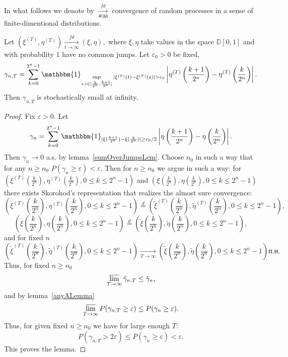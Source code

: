 \documentclass[12pt, a4paper, titlepage]{article}
\begin{document}
 In what follows we denote by $\xrightarrow[агдд]{fd}$ 
 convergence of random processes in a sense of finite-dimentional distributions. 
 \begin{lem}\label{sumOverJumpsStochasticLem}
  Let $(\xi^{(T)}, \eta^{(T)})\xrightarrow[t\to\infty]{fd} (\xi, \eta),$
  where $\xi, \eta$ take values in the space $\mathbb{D}[0,1]$
  and with probability $1$ have no common jumps.  
  Let $\varepsilon_0>0$ be fixed,
  $$\gamma_{n,T}=\sum\limits_{k=0}^{2^n-1}
  \mathbbm{1}_{\sup\limits_{s, t \in [\frac{k}{2^n}, \frac{k+1}{2^n}]}
  |\xi^{(T)}(t)-\xi^{(T)}(s)|>\varepsilon_0}
  \left|\eta^{(T)}\left(\frac{k+1}{2^n}\right)-\eta^{(T)}\left(\frac{k}{2^n}\right)\right|.$$
  Then $\gamma_{n,T}$ is stochastically small at infinity. 
 \end{lem}
 \begin{proof}
  Fix $\varepsilon>0.$
  Let 
  $$\gamma_n=\sum\limits_{k=0}^{2^n-1}
  \mathbbm{1}_{|\xi(\frac{k+1}{2^n})-\xi(\frac{k}{2^n})| \ge \varepsilon_0/2}
  \left|\eta\left(\frac{k+1}{2^n}\right)-\eta\left(\frac{k}{2^n}\right)\right|.$$
  Then $\gamma_n\to 0$ a.s. by lemma~\ref{sumOverJumpsLem}.
  Choose $n_0$ in such a way that for any $n \ge n_0$ $P(\gamma_n \ge \varepsilon)<\varepsilon.$
  Then for $n \ge n_0$ we argue in such a way:
  for $(\xi^{(T)}(\frac{k}{2^n}), \eta^{(T)}(\frac{k}{2^n}), 0 \le k \le 2^n-1)$
  and $(\xi(\frac{k}{2^n}), \eta(\frac{k}{2^n}), 0 \le k \le 2^n-1)$
  there exists Skorohod's representation that realizes the almost sure convergence:
  $$\left(\xi^{(T)}\left(\frac{k}{2^n}\right), \eta^{(T)}\left(\frac{k}{2^n}\right), 
  0 \le k \le 2^n-1\right) \stackrel{d}{=}
  \left(\tilde{\xi}^{(T)}\left(\frac{k}{2^n}\right), \tilde{\eta}^{(T)}\left(\frac{k}{2^n}\right), 
  0 \le k \le 2^n-1\right),$$
  $$\left(\xi\left(\frac{k}{2^n}\right), \eta\left(\frac{k}{2^n}\right), 
  0 \le k \le 2^n-1\right) \stackrel{d}{=}
  \left(\tilde{\xi}\left(\frac{k}{2^n}\right), \tilde{\eta}\left(\frac{k}{2^n}\right), 
  0 \le k \le 2^n-1\right),$$
  and for fixed $n$
  $$\left(\tilde{\xi}^{(T)}\left(\frac{k}{2^n}\right), \tilde{\eta}^{(T)}\left(\frac{k}{2^n}\right), 
  0 \le k \le 2^n-1\right) 
  \xrightarrow[T\to\infty]{}
  \left(\tilde{\xi}\left(\frac{k}{2^n}\right), \tilde{\eta}\left(\frac{k}{2^n}\right), 
  0 \le k \le 2^n-1\right) \mbox{п.н.}$$
  Thus, for fixed $n \ge n_0$
  $$\varlimsup\limits_{T \to \infty}\tilde{\gamma}_{n, T} \le \tilde{\gamma}_n,$$
  and by lemma~\ref{anyALemma}
  $$\varlimsup\limits_{T \to \infty}P(\gamma_{n, T} \ge \varepsilon)\le P(\gamma_n \ge \varepsilon).$$
  Thus, for given fixed $n \ge n_0$ we have for large enough $T$:
  $$P(\gamma_{n,T}>2\varepsilon) \le P(\gamma_n \ge \varepsilon)<\varepsilon.$$
  This proves the lemma. 
 \end{proof}
 
\end{document}
